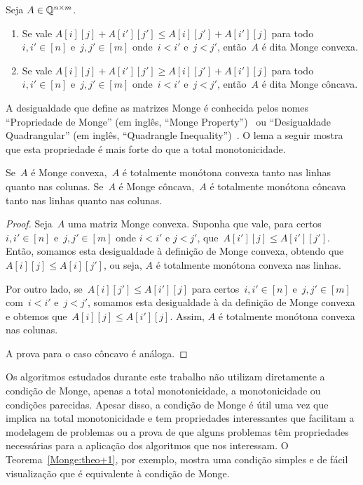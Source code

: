 \begin{defi} \label{defi:MatrizMonge}
Seja $A \in \mathbb{Q}^{n \times m}$.
    \begin{enumerate}
        \item Se vale $A[i][j] + A[i'][j'] \leq A[i][j'] + A[i'][j]$ para todo~${i,i' \in [n]}$ e~${j,j' \in [m]}$ onde~${i<i'}$ e~${j<j'}$, então~$A$ é dita Monge convexa.
        \item Se vale $A[i][j] + A[i'][j'] \geq A[i][j'] + A[i'][j]$ para todo~${i,i' \in [n]}$ e~${j,j' \in [m]}$ onde~${i<i'}$ e~${j<j'}$, então~$A$ é dita Monge côncava.
    \end{enumerate}
\end{defi}

A desigualdade que define as matrizes Monge é conhecida pelos nomes ``Propriedade de Monge'' (em inglês, ``Monge Property'')~\cite{Burkard:1996} ou ``Desigualdade Quadrangular'' (em inglês, ``Quadrangle Inequality'')~\cite{Bein:2009,Yao:1980}. O lema a seguir mostra que esta propriedade é mais forte do que a total monotonicidade. 

\begin{lema} \label{Monge:MCtoTM}
Se~$A$ é Monge convexa,~$A$ é totalmente monótona convexa tanto nas linhas quanto nas colunas. Se~$A$ é Monge côncava,~$A$ é totalmente monótona côncava tanto nas linhas quanto nas colunas.
\end{lema}

\begin{proof}
Seja~$A$ uma matriz Monge convexa. Suponha que vale, para certos~$i,i' \in [n]$ e~${ j,j' \in [m] }$ onde $i < i'$ e $j < j'$, que~$A[i'][j] \leq A[i'][j']$. Então, somamos esta desigualdade à definição de Monge convexa, obtendo que~$A[i][j] \leq A[i][j']$, ou seja, $A$ é totalmente monótona convexa nas linhas.  

Por outro lado, se~${ A[i][j'] \leq A[i'][j] }$ para certos~${ i,i' \in [n] }$ e~${ j,j' \in [m] }$ com~${i < i'}$ e~${j < j'}$, somamos esta desigualdade à da definição de Monge convexa e obtemos que~${ A[i][j] \leq A[i'][j] }$. Assim, $A$ é totalmente monótona convexa nas colunas.  

A prova para o caso côncavo é análoga.
\end{proof}

Os algoritmos estudados durante este trabalho não utilizam diretamente a condição de Monge, apenas a total monotonicidade, a monotonicidade ou condições parecidas. Apesar disso, a condição de Monge é útil uma vez que implica na total monotonicidade e tem propriedades interessantes que facilitam a modelagem de problemas ou a prova de que alguns problemas têm propriedades necessárias para a aplicação dos algoritmos que nos interessam. O Teorema~\ref{Monge:theo+1}, por exemplo, mostra uma condição simples e de fácil visualização que é equivalente à condição de Monge.


